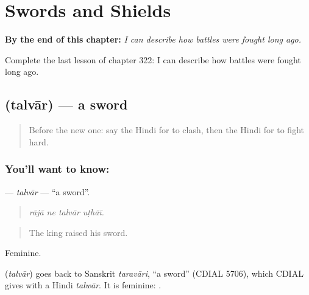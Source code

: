 
\chapter{Swords and Shields}
\label{ch:hi-swords-and-shields}

\begin{chapteropening}
\textbf{By the end of this chapter:} \emph{I can describe how battles were fought long ago.}

Complete the last lesson of chapter 322: I can describe how battles were fought long ago.
\end{chapteropening}

\section[\texorpdfstring{\hi{तलवार} (talvār)}{तलवार (talvār)}]{ (talvār) — a sword}

\label{lesson:HI-C322-talvar}



\begin{quote}
Before the new one: say the Hindi for to clash, then the Hindi for to fight hard.
\end{quote}

\subsection*{You'll want to know: }
\textbf{} — \emph{talvār} — \textquotedblleft{}a sword\textquotedblright{}.

\begin{quote}
   
\end{quote}

\begin{quote}
\emph{rājā ne talvār uṭhāī.}
\end{quote}

\begin{quote}
The king raised his sword.
\end{quote}

Feminine.

\begin{cousinweb}
\textbf{} (\emph{talvār}) goes back to Sanskrit \emph{taravāri}, \textquotedblleft{}a sword\textquotedblright{} (CDIAL 5706), which CDIAL gives with a Hindi \emph{talwār}. It is feminine: \textbf{ }.
\end{cousinweb}

